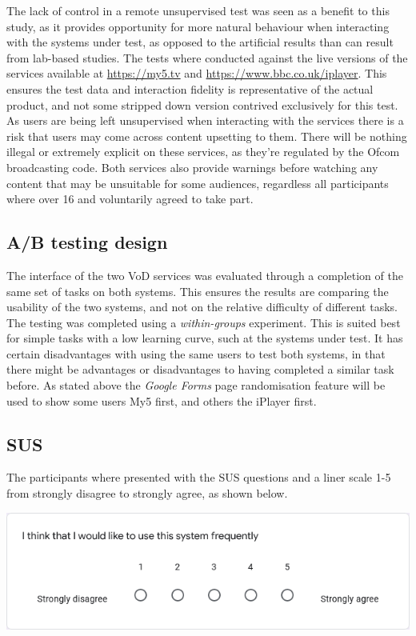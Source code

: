 \documentclass[12pt,a4paper,x11names]{article}
\begin{document}
The lack of control in a remote unsupervised test was seen as a benefit to this study, as it provides opportunity for more natural behaviour when interacting with the systems under test, as opposed to the artificial results than can result from lab-based studies. The tests where conducted against the live versions of the services available at \url{https://my5.tv} and \url{https://www.bbc.co.uk/iplayer}. This ensures the test data and interaction fidelity is representative of the actual product, and not some stripped down version contrived exclusively for this test. As users are being left unsupervised when interacting with the services there is a risk that users may come across content upsetting to them. There will be nothing illegal or extremely explicit on these services, as they're regulated by the Ofcom broadcasting code\cite{ofcom-broadcasting-code}. Both services also provide warnings before watching any content that may be unsuitable for some audiences, regardless all participants where over 16 and voluntarily agreed to take part.

\subsection{A/B testing design}
The interface of the two VoD services was evaluated through a completion of the same set of tasks on both systems. This ensures the results are comparing the usability of the two systems, and not on the relative difficulty of different tasks. The testing was completed using a \textit{within-groups} experiment. This is suited best for simple tasks with a low learning curve, such at the systems under test\cite{lewistask}. It has certain disadvantages with using the same users to test both systems, in that there might be advantages or disadvantages to having completed a similar task before. As stated above the \textit{Google Forms} page randomisation feature will be used to show some users My5 first, and others the iPlayer first. 

\subsection{SUS}
The participants where presented with the SUS questions and a liner scale 1-5 from strongly disagree to strongly agree, as shown below.

\begin{center}
\includegraphics[scale=0.5]{sus-screenshot.png}
\end{center}
\end{document}
